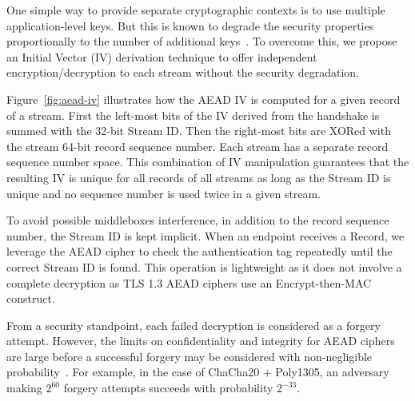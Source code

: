 One simple way to provide separate cryptographic contexts is to use multiple application-level
keys. But this is known to degrade the security properties proportionally to the number of
additional keys~\cite{chatterjee2011another}. To overcome this, we propose an
Initial Vector (IV) derivation technique to offer independent
encryption/decryption to each stream without the security degradation.

Figure~\ref{fig:aead-iv} illustrates how the AEAD IV is computed for a 
given \tcpls record of a \tcpls stream. First the left-most bits of the IV derived from the \tls handshake
is summed with the 32-bit \tcpls Stream ID. Then the right-most bits are XORed with the
stream 64-bit record sequence number. Each \tcpls stream has a separate record
sequence number space. This combination of IV manipulation guarantees that the
resulting IV is unique for all records of all \tcpls streams as long as the
Stream ID is unique and no sequence number is used twice in a given stream.

To avoid possible middleboxes interference, in addition to the record sequence number, 
the \tcpls Stream ID is kept implicit. When an endpoint receives a \tcpls Record, 
we leverage the AEAD cipher to check the authentication tag repeatedly until the
correct \tcpls Stream ID is found. This operation is lightweight as it does not
involve a complete decryption as TLS 1.3 AEAD ciphers use an Encrypt-then-MAC construct.

From a security standpoint, each failed decryption is considered as a
forgery attempt. However, the limits on confidentiality and
integrity for AEAD ciphers are large before a
successful forgery may be considered with non-negligible probability~\cite{luykx2015limits, aeadlimits}. For
example, in the case of ChaCha20 + Poly1305, an adversary making $2^{60}$ forgery
attempts succeeds with probability $2^{-33}$.


%

